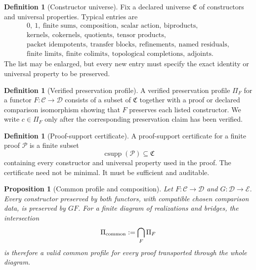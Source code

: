 \documentclass[11pt]{article}
\newtheorem{proposition}[theorem]{Proposition}
\theoremstyle{definition}
\newtheorem{definition}[theorem]{Definition}
\theoremstyle{remark}
\begin{document}
\begin{definition}[Constructor universe]
\label{def:constructor-universe}
Fix a declared universe \(\mathfrak C\) of constructors and universal properties.  Typical entries are
\[
\begin{gathered}
0,\ 1,\ \text{finite sums},\ \text{composition},\ \text{scalar action},\ \text{biproducts},\\
\text{kernels},\ \text{cokernels},\ \text{quotients},\ \text{tensor products},\\
\text{packet idempotents},\ \text{transfer blocks},\ \text{refinements},\ \text{named residuals},\\
\text{finite limits},\ \text{finite colimits},\ \text{topological completions},\ \text{adjoints}.
\end{gathered}
\]
The list may be enlarged, but every new entry must specify the exact identity or universal property to be preserved.
\end{definition}

\begin{definition}[Verified preservation profile]
\label{def:verified-preservation-profile-expanded}
A verified preservation profile \(\Pi_F\) for a functor \(F:\mathcal C\to\mathcal D\) consists of a subset of \(\mathfrak C\) together with a proof or declared comparison isomorphism showing that \(F\) preserves each listed constructor.  We write \(c\in\Pi_F\) only after the corresponding preservation claim has been verified.
\end{definition}

\begin{definition}[Proof-support certificate]
\label{def:proof-support-certificate}
A proof-support certificate for a finite proof \(\mathcal P\) is a finite subset
\[
\operatorname{csupp}(\mathcal P)\subseteq\mathfrak C
\]
containing every constructor and universal property used in the proof.  The certificate need not be minimal.  It must be sufficient and auditable.
\end{definition}

\begin{proposition}[Common profile and composition]
\label{prop:common-profile-composition}
Let \(F:\mathcal C\to\mathcal D\) and \(G:\mathcal D\to\mathcal E\).  Every constructor preserved by both functors, with compatible chosen comparison data, is preserved by \(GF\).  For a finite diagram of realizations and bridges, the intersection
\[
\Pi_{\rm common}:=\bigcap_F\Pi_F
\]
is therefore a valid common profile for every proof transported through the whole diagram.
\end{proposition}
\end{document}
